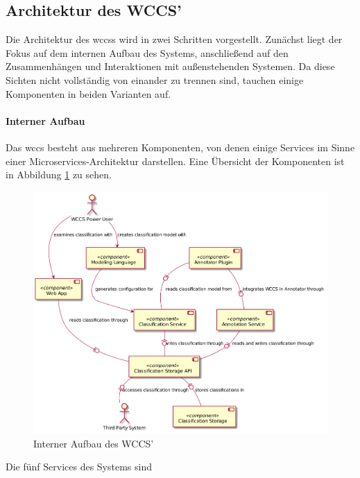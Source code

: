     \subsection{Architektur des WCCS'}
        \label{section:solutionConceptWCCSArch}
        Die Architektur des \glspl{wccs} wird in zwei Schritten vorgestellt.
        Zunächst liegt der Fokus auf dem internen Aufbau des Systems,
        anschließend auf den Zusammenhängen und Interaktionen mit außenstehenden Systemen.
        Da diese Sichten nicht vollständig von einander zu trennen sind,
        tauchen einige Komponenten in beiden Varianten auf.
        
        \paragraph{Interner Aufbau}
        Das \gls{wccs} besteht aus mehreren Komponenten,
        von denen einige Services im Sinne einer Microservices-Architektur darstellen.
        Eine Übersicht der Komponenten ist in Abbildung \ref{image:wccsInternalArchitecture} zu sehen.

        \begin{figure}
            \centering
            \includegraphics[scale=\imageScalingFactor]{../resources/architecture/wccs_internal_architecture.png}
            \caption{Interner Aufbau des WCCS'}
            \label{image:wccsInternalArchitecture}
        \end{figure}

        Die fünf Services des Systems sind

